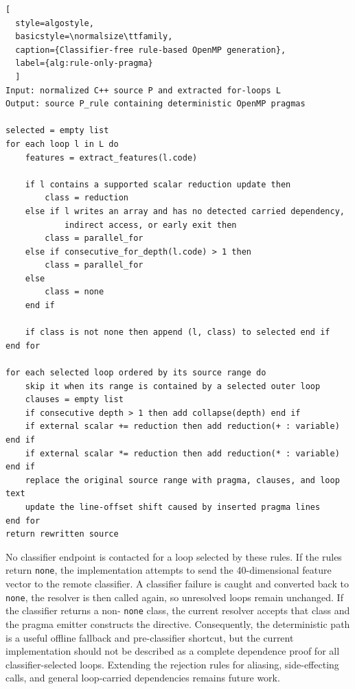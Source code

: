 \documentclass[12pt,a4paper,oneside]{report}
\begin{document}
\noindent\begin{minipage}{\textwidth}
\begin{lstlisting}[
  style=algostyle,
  basicstyle=\normalsize\ttfamily,
  caption={Classifier-free rule-based OpenMP generation},
  label={alg:rule-only-pragma}
  ]
Input: normalized C++ source P and extracted for-loops L
Output: source P_rule containing deterministic OpenMP pragmas

selected = empty list
for each loop l in L do
    features = extract_features(l.code)

    if l contains a supported scalar reduction update then
        class = reduction
    else if l writes an array and has no detected carried dependency,
            indirect access, or early exit then
        class = parallel_for
    else if consecutive_for_depth(l.code) > 1 then
        class = parallel_for
    else
        class = none
    end if

    if class is not none then append (l, class) to selected end if
end for

for each selected loop ordered by its source range do
    skip it when its range is contained by a selected outer loop
    clauses = empty list
    if consecutive depth > 1 then add collapse(depth) end if
    if external scalar += reduction then add reduction(+ : variable) end if
    if external scalar *= reduction then add reduction(* : variable) end if
    replace the original source range with pragma, clauses, and loop text
    update the line-offset shift caused by inserted pragma lines
end for
return rewritten source
\end{lstlisting}
\end{minipage}

No classifier endpoint is contacted for a loop selected by these rules. If the
rules return \texttt{none}, the implementation attempts to send the
40-dimensional feature vector to the remote classifier. A classifier failure is
caught and converted back to \texttt{none}, the resolver is then called again,
so unresolved loops remain unchanged. If the classifier returns a non-
\texttt{none} class, the current resolver accepts that class and the pragma
emitter constructs the directive. Consequently, the deterministic path is a
useful offline fallback and pre-classifier shortcut, but the current
implementation should not be described as a complete dependence proof for all
classifier-selected loops. Extending the rejection rules for aliasing,
side-effecting calls, and general loop-carried dependencies remains future work.
\end{document}
